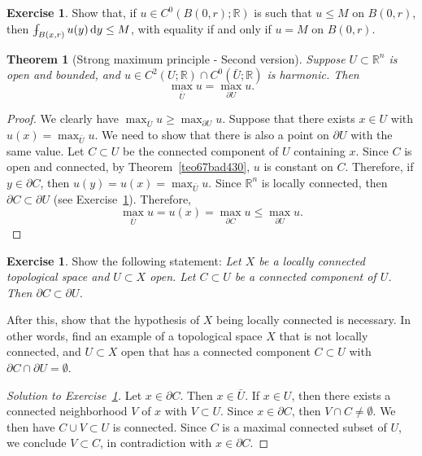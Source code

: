 \documentclass[a4paper,9pt]{amsart}
\newcommand{\R}{\mathbb{R}}	%
\newcommand{\did}{\,\mathrm{d}}	%
\newcommand{\de}{\partial}		%
\def\Xint#1{\mathchoice
      {\XXint\displaystyle\textstyle{#1}}%
      {\XXint\textstyle\scriptstyle{#1}}%
      {\XXint\scriptstyle\scriptscriptstyle{#1}}%
      {\XXint\scriptscriptstyle\scriptscriptstyle{#1}}%
      \!\int}
\def\XXint#1#2#3{{\setbox0=\hbox{$#1{#2#3}{\int}$}
        \vcenter{\hbox{$#2#3$}}\kern-.5\wd0}}
\def\fint{\Xint-}
\theoremstyle{plain}
\newtheorem{theorem}[proposition]{Theorem}
\theoremstyle{definition}
\newtheorem{exercise}[proposition]{Exercise}%
\theoremstyle{remark}
\begin{document}
\begin{exercise}
	Show that, if $u\in C^0(B(0,r);\R)$ is such that $u\le M$ on $B(0,r)$, then
	$\fint_{B(x,r)} u(y) \did y\le M$, with equality if and only if $u=M$ on $B(0,r)$.
\end{exercise}

\begin{theorem}[Strong maximum principle - Second version]\label{teo67bad761}
	Suppose $U\subset\R^n$ is open and bounded,
	and $u\in C^2(U;\R)\cap C^0(\bar U;\R)$ is harmonic.
	Then
	\begin{equation}\label{eq67bad7a9}
		\max_{\bar U} u = \max_{\de U} u .
	\end{equation}
\end{theorem}
\begin{proof}
	We clearly have $\max_{\bar U} u \ge \max_{\de U} u$.
	Suppose that there exists $x\in U$ with $u(x) = \max_{\bar U}u$.
	We need to show that there is also a point on $\de U$ with the same value.
	Let $C\subset U$ be the connected component of $U$ containing $x$.
	Since $C$ is open and connected, by Theorem~\ref{teo67bad430}, $u$ is constant on $C$.
	Therefore, if $y\in\de C$, then $u(y) = u(x) = \max_{\bar U}u$.
	Since $\R^n$ is locally connected, then $\de C\subset \de U$ (see Exercise~\ref{ex67baddda}).
	Therefore, 
	\[
	\max_{\bar U}u = u(x) = \max_{\de C}u \le \max_{\de U} u .
	\]
\end{proof}

\begin{exercise}\label{ex67baddda}
	Show the following statement:
	{\it Let $X$ be a locally connected topological space and $U\subset X$ open.
	Let $C\subset U$ be a connected component of $U$.
	Then $\de C\subset\de U$.}
	
	After this, show that the hypothesis of $X$ being locally connected is necessary.
	In other words, find an example of a topological space $X$ that is not locally connected, and $U\subset X$ open that has a connected component $C\subset U$ with $\de C\cap\de U=\emptyset$.
\end{exercise}
\begin{proof}[Solution to Exercise~\ref{ex67baddda}]
	Let $x\in\de C$.
	Then $x\in\bar U$.
	If $x\in U$, then there exists a connected neighborhood $V$ of $x$ with $V\subset U$.
	Since $x\in\de C$, then $V\cap C\neq\emptyset$.
	We then have $C\cup V\subset U$ is connected.
	Since $C$ is a maximal connected subset of $U$, we conclude $V\subset C$, in contradiction with $x\in\de C$.
\end{proof}
\end{document}
